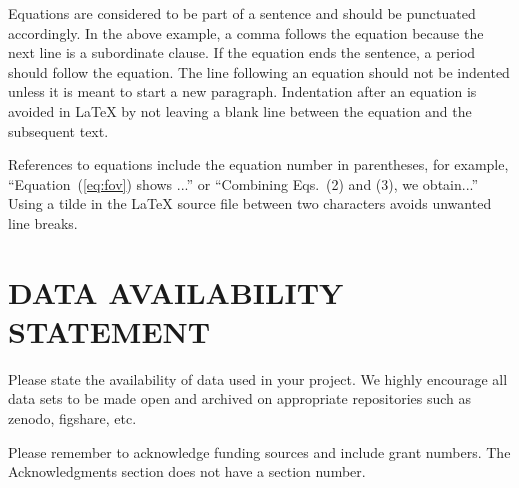 \documentclass[]{spie}  %
\begin{document}
Equations are considered to be part of a sentence and should be punctuated accordingly. In the above example, a comma follows the equation because the next line is a subordinate clause.  If the equation ends the sentence, a period should follow the equation.  The line following an equation should not be indented unless it is meant to start a new paragraph.  Indentation after an equation is avoided in LaTeX by not leaving a blank line between the equation and the subsequent text.

References to equations include the equation number in parentheses, for example, ``Equation~(\ref{eq:fov}) shows ...'' or ``Combining Eqs.~(2) and (3), we obtain...''  Using a tilde in the LaTeX source file between two characters avoids unwanted line breaks.



\section*{DATA AVAILABILITY STATEMENT}    
Please state the availability of data used in your project. We highly encourage all data sets to be made open and archived on appropriate repositories such as zenodo, figshare, etc. 

\acknowledgments %
 
Please remember to acknowledge funding sources and include grant numbers. The Acknowledgments section does not have a section number.

\end{document}
